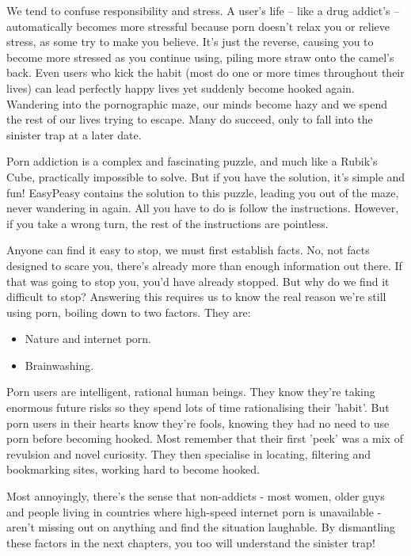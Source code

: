 \documentclass[
]{book}
\begin{document}
We tend to confuse responsibility and stress. A user's life -- like a drug addict's -- automatically becomes more stressful because porn doesn't relax you or relieve stress, as some try to make you believe. It's just the reverse, causing you to become more stressed as you continue using, piling more straw onto the camel's back. Even users who kick the habit (most do one or more times throughout their lives) can lead perfectly happy lives yet suddenly become hooked again. Wandering into the pornographic maze, our minds become hazy and we spend the rest of our lives trying to escape. Many do succeed, only to fall into the sinister trap at a later date.

Porn addiction is a complex and fascinating puzzle, and much like a Rubik's Cube, practically impossible to solve. But if you have the solution, it's simple and fun! EasyPeasy contains the solution to this puzzle, leading you out of the maze, never wandering in again. All you have to do is follow the instructions. However, if you take a wrong turn, the rest of the instructions are pointless.

Anyone can find it easy to stop, we must first establish facts. No, not facts designed to scare you, there's already more than enough information out there. If that was going to stop you, you'd have already stopped. But why do we find it difficult to stop? Answering this requires us to know the real reason we're still using porn, boiling down to two factors. They are:

\begin{itemize}
\item
  Nature and internet porn.
\item
  Brainwashing.
\end{itemize}

Porn users are intelligent, rational human beings. They know they're taking enormous future risks so they spend lots of time rationalising their 'habit'. But porn users in their hearts know they're fools, knowing they had no need to use porn before becoming hooked. Most remember that their first 'peek' was a mix of revulsion and novel curiosity. They then specialise in locating, filtering and bookmarking sites, working hard to become hooked.

Most annoyingly, there's the sense that non-addicts - most women, older guys and people living in countries where high-speed internet porn is unavailable - aren't missing out on anything and find the situation laughable. By dismantling these factors in the next chapters, you too will understand the sinister trap!
\end{document}
